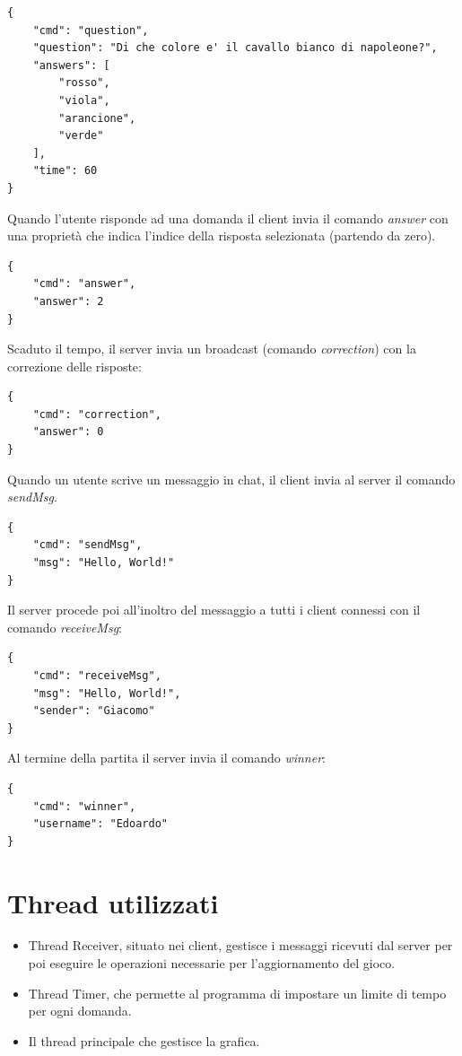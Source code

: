\documentclass[a4paper,12pt]{report}
\begin{document}
\begin{lstlisting}
{
    "cmd": "question",
    "question": "Di che colore e' il cavallo bianco di napoleone?",
    "answers": [
        "rosso",
        "viola",
        "arancione",
        "verde"
    ],
    "time": 60
}
\end{lstlisting}

Quando l'utente risponde ad una domanda il client invia il comando \emph{answer} con una proprietà che indica l'indice della risposta selezionata (partendo da zero).

\begin{lstlisting}
{
    "cmd": "answer",
    "answer": 2
}
\end{lstlisting}

Scaduto il tempo, il server invia un broadcast (comando \emph{correction}) con la correzione delle risposte:

\begin{lstlisting}
{
    "cmd": "correction",
    "answer": 0
}
\end{lstlisting}

Quando un utente scrive un messaggio in chat, il client invia al server il comando \emph{sendMsg}.

\begin{lstlisting}
{
    "cmd": "sendMsg",
    "msg": "Hello, World!"
}
\end{lstlisting}

Il server procede poi all'inoltro del messaggio a tutti i client connessi con il comando \emph{receiveMsg}:

\begin{lstlisting}
{
    "cmd": "receiveMsg",
    "msg": "Hello, World!",
    "sender": "Giacomo"
}
\end{lstlisting}
				
Al termine della partita il server invia il comando \emph{winner}:

\begin{lstlisting}
{
    "cmd": "winner",
    "username": "Edoardo"
}
\end{lstlisting}
				
\section{Thread utilizzati}
\begin{itemize}

\item Thread Receiver, situato nei client, gestisce i messaggi ricevuti dal server per poi eseguire le operazioni necessarie per l'aggiornamento del gioco.
								
\item Thread Timer, che permette al programma di impostare un limite di tempo per ogni domanda.
								
\item Il thread principale che gestisce la grafica.

\end{itemize}
				
\end{document}

